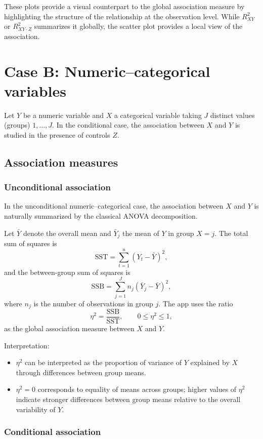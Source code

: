 \documentclass[11pt,a4paper]{article}
\begin{document}
These plots provide a visual counterpart to the global association measure by highlighting the structure of the relationship at the observation level.
While $R^2_{XY}$ or $R^2_{XY\cdot Z}$ summarizes it globally, the scatter plot provides a local view of the association.

\section{Case B: Numeric--categorical variables}

Let $Y$ be a numeric variable and $X$ a categorical variable taking $J$ distinct values (groups) $1,\dots,J$. In the conditional case, the association between $X$ and $Y$ is studied in the presence of controls $Z$.

\subsection{Association measures}

\subsubsection*{Unconditional association}

In the unconditional numeric--categorical case, the association between $X$ and $Y$ is naturally summarized by the classical ANOVA decomposition.

Let $\bar{Y}$ denote the overall mean and $\bar{Y}_j$ the mean of $Y$ in group $X=j$. The total sum of squares is
\[
  \mathrm{SST} = \sum_{t=1}^n (Y_t - \bar{Y})^2,
\]
and the between-group sum of squares is
\[
  \mathrm{SSB} = \sum_{j=1}^J n_j (\bar{Y}_j - \bar{Y})^2,
\]
where $n_j$ is the number of observations in group $j$. The app uses the ratio
\[
  \eta^2 = \frac{\mathrm{SSB}}{\mathrm{SST}}, \qquad 0 \le \eta^2 \le 1,
\]
as the global association measure between $X$ and $Y$.

Interpretation:
\begin{itemize}
\item $\eta^2$ can be interpreted as the proportion of variance of $Y$ explained by $X$ through differences between group means.
\item $\eta^2 = 0$ corresponds to equality of means across groups; higher values of $\eta^2$ indicate stronger differences between group means relative to the overall variability of $Y$.
\end{itemize}

\subsubsection*{Conditional association}
\end{document}

